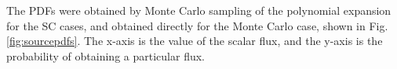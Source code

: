 The PDFs were obtained by Monte Carlo sampling of the polynomial expansion for the SC cases, and obtained directly for the Monte Carlo case, shown in Fig. \ref{fig:sourcepdfs}.  The x-axis is the value of the scalar flux, and the y-axis is the probability of obtaining a particular flux.


%
